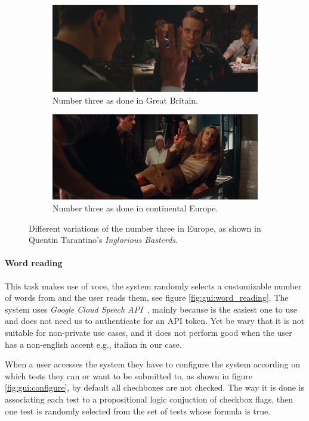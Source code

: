 \begin{figure}[h!t]
    \centering
    \begin{subfigure}{\textwidth}
        \centering
        \includegraphics[scale=0.15]{assets/images/inglorious_basterds_english.jpg}
        \caption{Number three as done in Great Britain.}
        \label{fig:inglorious:english}
    \end{subfigure}
    \begin{subfigure}{\textwidth}
        \centering
        \includegraphics[scale=0.15]{assets/images/inglorious_basterds_german.png}
        \caption{Number three as done in continental Europe.}
        \label{fig:inglorious:german}
    \end{subfigure}
    \caption{Different variations of the number three in Europe, as shown in Quentin Tarantino's \emph{Inglorious Basterds}.}
    \label{fig:inglorious}
\end{figure}


\paragraph{Word reading}
This task makes use of voce, the system randomly selects a customizable number of words from \cite{dwyl2022engwords} and the user reads them, see figure \ref{fig:gui:word_reading}.
The system uses \emph{Google Cloud Speech API}~\cite{google2022speech}, mainly because is the easiest one to use and does not need us to authenticate for an API token.
Yet be wary that it is not suitable for non-private use cases, and it does not perform good when the user has a non-english accent e.g., italian in our case.

When a user accesses the system they have to configure the system according on which tests they can or want to be submitted to, as shown in figure \ref{fig:gui:configure}, by default all chechboxes are not checked.
The way it is done is associating each test to a propositional logic conjuction of checkbox flags, then one test is randomly selected from the set of tests whose formula is true.
